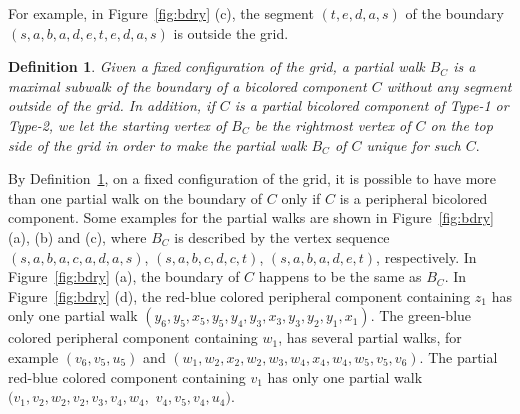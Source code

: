 \documentclass[
final, nomarks
]{dmtcs-episciences}
\newtheorem{definition}{Definition}
\begin{document}
For example, in Figure~\ref{fig:bdry} (c), the segment $(t, e, d, a, s)$ of the boundary  $(s, a, b, a, d, e, t, e, d, a, s)$ is outside the grid.  
\begin{definition}\label{defn:BC}
Given a fixed configuration of the grid, {\it a partial walk $B_C$} is a maximal subwalk of the boundary of a bicolored component $C$ without any segment outside of the grid. In addition, if $C$ is a partial bicolored component of Type-1 or Type-2, we let the  starting vertex of $B_C$ be the rightmost vertex of $C$ on the top side of the grid in order to make the partial walk $B_C$ of $C$ unique for such $C.$ 
\end{definition} 
By Definition~\ref{defn:BC}, on a fixed configuration of the grid, it is possible to have more than one partial walk on the boundary of $C$ only if $C$ is a peripheral bicolored component.
Some examples for the partial walks are shown in Figure~\ref{fig:bdry} (a), (b) and (c), where $B_C$ is described by the vertex sequence $(s, a, b, a, c, a, d, a, s)$, $(s, a, b, c, d, c, t)$, $(s, a, b, a, d, e, t)$, respectively. In Figure~\ref{fig:bdry} (a), the boundary of $C$ happens to be the same as $B_C.$ In Figure~\ref{fig:bdry} (d), the red-blue colored peripheral component containing $z_1$ has only one partial walk $(y_6, y_5, x_5, y_5, y_4, y_3, x_3, y_3, y_2, y_1, x_1).$ The green-blue colored peripheral component containing  $w_1$, has several partial walks, for example $(v_6, v_5, u_5)$ and $(w_1, w_2, x_2, w_2, w_3, w_4, x_4, w_4, w_5, v_5, v_6).$ The partial red-blue colored component containing $v_1$ has only one partial walk $(v_1, v_2, w_2, v_2, v_3, v_4, w_4,$ $ v_4, v_5, v_4, u_4).$  
\end{document}
